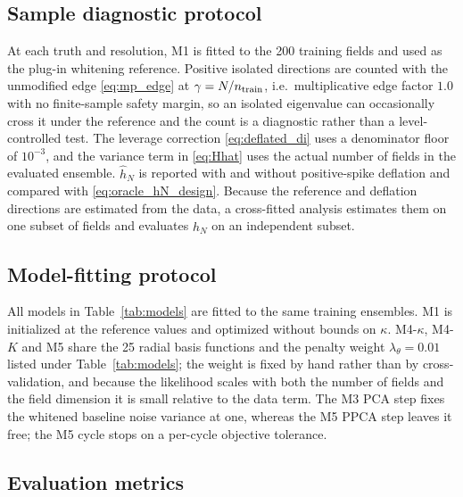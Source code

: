 \documentclass[11pt]{article}
\numberwithin{table}{section}
\numberwithin{figure}{section}
\begin{document}
\subsection{Sample diagnostic protocol}
\label{sec:sample_protocol}

At each truth and resolution, M1 is fitted to the 200 training fields and used as the plug-in whitening reference. Positive isolated directions are counted with the unmodified edge \eqref{eq:mp_edge} at $\gamma=N/n_{\rm train}$, i.e.\ multiplicative edge factor $1.0$ with no finite-sample safety margin, so an isolated eigenvalue can occasionally cross it under the reference and the count is a diagnostic rather than a level-controlled test. The leverage correction \eqref{eq:deflated_di} uses a denominator floor of $10^{-3}$, and the variance term in \eqref{eq:Hhat} uses the actual number of fields in the evaluated ensemble. $\widehat h_N$ is reported with and without positive-spike deflation and compared with \eqref{eq:oracle_hN_design}. Because the reference and deflation directions are estimated from the data, a cross-fitted analysis estimates them on one subset of fields and evaluates $\widehat h_N$ on an independent subset.

\subsection{Model-fitting protocol}
\label{sec:model_fit_design}

All models in Table~\ref{tab:models} are fitted to the same training ensembles. M1 is initialized at the reference values and optimized without bounds on $\kappa$. M4-$\kappa$, M4-$K$ and M5 share the 25 radial basis functions and the penalty weight $\lambda_\theta=0.01$ listed under Table~\ref{tab:models}; the weight is fixed by hand rather than by cross-validation, and because the likelihood scales with both the number of fields and the field dimension it is small relative to the data term. The M3 PCA step fixes the whitened baseline noise variance at one, whereas the M5 PPCA step leaves it free; the M5 cycle stops on a per-cycle objective tolerance.

\subsection{Evaluation metrics}
\label{sec:evaluation_metrics}
\end{document}
